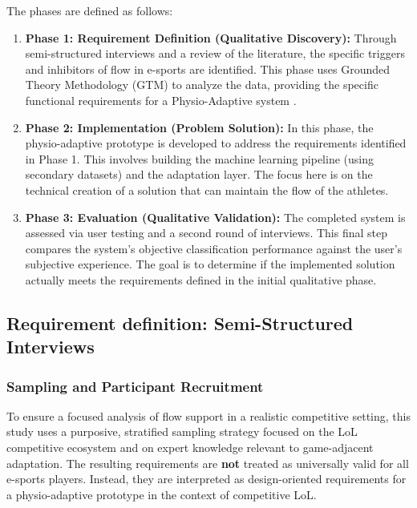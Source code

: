 The phases are defined as follows:

\begin{enumerate}
    \item \textbf{Phase 1: Requirement Definition (Qualitative Discovery):} Through semi-structured interviews and a review of the literature, the specific triggers and inhibitors of flow in e-sports are identified. This phase uses Grounded Theory Methodology (GTM) to analyze the data, providing the specific functional requirements for a Physio-Adaptive system \autocite{recker2021researchmethods}.
    
    \item \textbf{Phase 2: Implementation (Problem Solution):} In this phase, the physio-adaptive prototype is developed to address the requirements identified in Phase 1. This involves building the machine learning pipeline (using secondary datasets) and the adaptation layer. The focus here is on the technical creation of a solution that can maintain the flow of the athletes.
    
    \item \textbf{Phase 3: Evaluation (Qualitative Validation):} The completed system is assessed via user testing and a second round of interviews. This final step compares the system's objective classification performance against the user's subjective experience. The goal is to determine if the implemented solution actually meets the requirements defined in the initial qualitative phase.
\end{enumerate}

\subsection{Requirement definition: Semi-Structured Interviews}



\subsubsection{Sampling and Participant Recruitment}
To ensure a focused analysis of flow support in a realistic competitive setting, this study uses a purposive, stratified sampling strategy focused on the LoL competitive ecosystem and on expert knowledge relevant to game-adjacent adaptation. The resulting requirements are \textbf{not} treated as universally valid for all e-sports players. Instead, they are interpreted as design-oriented requirements for a physio-adaptive prototype in the context of competitive LoL.

